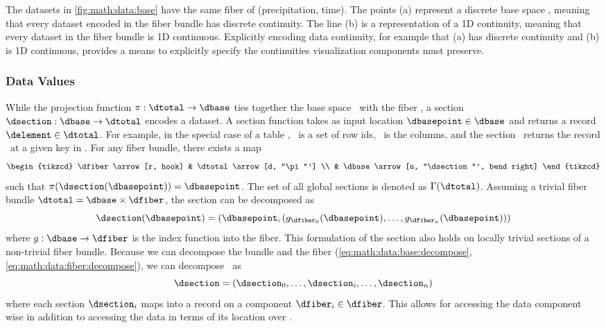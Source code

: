 \documentclass[../main.tex]{subfiles}
\begin{document}
The datasets in \autoref{fig:math:data:base} have the same fiber of (precipitation, time). The points (a) represent a discrete base space \dbase, meaning that every dataset encoded in the fiber bundle has discrete continuity. The line (b) is a representation of a 1D continuity, meaning that every dataset in the fiber bundle is 1D continuous. Explicitly encoding data continuity, for example that (a) has discrete continuity and (b) is 1D continuous, provides a means to explicitly specify the continuities visualization components must preserve. 
 
\subsubsection{Data Values}
\label{sec:math:data:section}
While the projection function \(\pi:\dtotal \rightarrow\dbase\) ties together the base space \dbase\ with the fiber \dfiber, a section \(\dsection: \dbase\rightarrow \dtotal\) encodes a dataset. A section function takes as input location \(\dbasepoint \in \dbase\) and returns a record \(\delement \in \dtotal\). For example, in the special case of a table \cite{spivakSIMPLICIALDATABASES}, \dbase\ is a set of row ids, \dfiber\ is the columns, and the section \dsection\ returns the record \delement\ at a given key in \dbase. For any fiber bundle, there exists a map
\begin{equation}
    \begin{tikzcd}
        \dfiber \arrow[r, hook] & \dtotal \arrow[d, "\pi"'] \\
                          & \dbase \arrow[u, "\dsection"', bend right]
    \end{tikzcd}
\end{equation}
 such that \(\pi(\dsection(\dbasepoint)) = \dbasepoint\). The set of all global sections is denoted as \(\Gamma(\dtotal)\). Assuming a trivial fiber bundle \(\dtotal = \dbase \times \dfiber\), the section can be decomposed as 
\begin{equation}
    \label{eq:section_return}
    \dsection(\dbasepoint) = (\dbasepoint, (g_{\dfiber_{0}}(\dbasepoint), \ldots, g_{\dfiber_{n}}(\dbasepoint)))
\end{equation}
where \(g: \dbase \rightarrow \dfiber\) is the index function into the fiber. This formulation of the section also holds on locally trivial sections of a non-trivial fiber bundle. Because we can decompose the bundle and the fiber (\autoref{eq:math:data:base:decompose}, \autoref{eq:math:data:fiber:decompose}), we can decompose \dsection\ as 
\begin{equation}
\label{eq:math:data:section:decompose}
\dsection= (\dsection_0,\ldots, \dsection_i, \dots, \dsection_n) 
\end{equation}
where each section \(\dsection_i\) maps into a record on a component \(\dfiber_i \in \dfiber\). This allows for accessing the data component wise in addition to accessing the data in terms of its location over \dbase.
\end{document}
